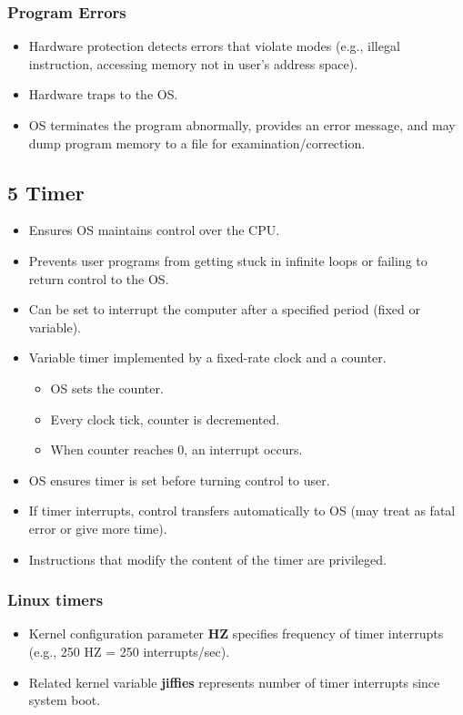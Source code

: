 \documentclass{article}
\begin{document}
\subsubsection*{Program Errors}
\begin{itemize}
    \item Hardware protection detects errors that violate modes (e.g., illegal instruction, accessing memory not in user's address space).
    \item Hardware traps to the OS.
    \item OS terminates the program abnormally, provides an error message, and may dump program memory to a file for examination/correction.
\end{itemize}

\subsection*{5 Timer}
\begin{itemize}
    \item Ensures OS maintains control over the CPU.
    \item Prevents user programs from getting stuck in infinite loops or failing to return control to the OS.
    \item Can be set to interrupt the computer after a specified period (fixed or variable).
    \item Variable timer implemented by a fixed-rate clock and a counter.
    \begin{itemize}
        \item OS sets the counter.
        \item Every clock tick, counter is decremented.
        \item When counter reaches 0, an interrupt occurs.
    \end{itemize}
    \item OS ensures timer is set before turning control to user.
    \item If timer interrupts, control transfers automatically to OS (may treat as fatal error or give more time).
    \item Instructions that modify the content of the timer are privileged.
\end{itemize}

\subsubsection*{Linux timers}
\begin{itemize}
    \item Kernel configuration parameter \textbf{HZ} specifies frequency of timer interrupts (e.g., 250 HZ = 250 interrupts/sec).
    \item Related kernel variable \textbf{jiffies} represents number of timer interrupts since system boot.
\end{itemize}
\end{document}
